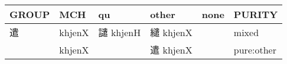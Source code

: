 \documentclass[14pt,a4paper]{scrartcl}
\begin{document}
\begin{longtable}[c]{@{}llllll@{}}
\toprule
\begin{minipage}[b]{0.14\columnwidth}\raggedright\strut
GROUP
\strut\end{minipage} &
\begin{minipage}[b]{0.14\columnwidth}\raggedright\strut
MCH
\strut\end{minipage} &
\begin{minipage}[b]{0.14\columnwidth}\raggedright\strut
qu
\strut\end{minipage} &
\begin{minipage}[b]{0.14\columnwidth}\raggedright\strut
other
\strut\end{minipage} &
\begin{minipage}[b]{0.14\columnwidth}\raggedright\strut
none
\strut\end{minipage} &
\begin{minipage}[b]{0.14\columnwidth}\raggedright\strut
PURITY
\strut\end{minipage}\tabularnewline
\midrule
\endhead
\begin{minipage}[t]{0.14\columnwidth}\raggedright\strut
遣
\strut\end{minipage} &
\begin{minipage}[t]{0.14\columnwidth}\raggedright\strut
khjenX
\strut\end{minipage} &
\begin{minipage}[t]{0.14\columnwidth}\raggedright\strut
譴 khjenH
\strut\end{minipage} &
\begin{minipage}[t]{0.14\columnwidth}\raggedright\strut
繾 khjenX
\strut\end{minipage} &
\begin{minipage}[t]{0.14\columnwidth}\raggedright\strut
\strut\end{minipage} &
\begin{minipage}[t]{0.14\columnwidth}\raggedright\strut
mixed
\strut\end{minipage}\tabularnewline
\begin{minipage}[t]{0.14\columnwidth}\raggedright\strut
𠳋
\strut\end{minipage} &
\begin{minipage}[t]{0.14\columnwidth}\raggedright\strut
khjenX
\strut\end{minipage} &
\begin{minipage}[t]{0.14\columnwidth}\raggedright\strut
\strut\end{minipage} &
\begin{minipage}[t]{0.14\columnwidth}\raggedright\strut
遣 khjenX
\strut\end{minipage} &
\begin{minipage}[t]{0.14\columnwidth}\raggedright\strut
\strut\end{minipage} &
\begin{minipage}[t]{0.14\columnwidth}\raggedright\strut
pure:other
\strut\end{minipage}\tabularnewline
\bottomrule
\end{longtable}
\end{document}
